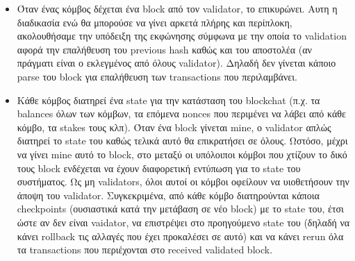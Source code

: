 \documentclass[12pt, a4paper]{article}
\begin{document}
	\begin{itemize}
		\item Όταν ένας κόμβος δέχεται ένα block από τον validator, το επικυρώνει. Αυτη η διαδικασία ενώ θα μπορούσε να γίνει αρκετά πλήρης και περίπλοκη, ακολουθήσαμε την υπόδειξη της εκφώνησης σύμφωνα με την οποία το validation αφορά την επαλήθευση του previous hash καθώς και του αποστολέα (αν πράγματι είναι ο εκλεγμένος από όλους validator). Δηλαδή δεν γίνεται κάποιο parse του block για επαλήθευση των transactions που περιλαμβάνει.
		\item Κάθε κόμβος διατηρεί ένα state για την κατάσταση του blockchat (π.χ. τα balances όλων των κόμβων, τα επόμενα nonces που περιμένει να λάβει από κάθε κόμβο, τα stakes τους κλπ). Όταν ένα block γίνεται mine, ο validator απλώς διατηρεί το state του καθώς τελικά αυτό θα επικρατήσει σε όλους. Ωστόσο, μέχρι να γίνει mine αυτό το block, στο μεταξύ οι υπόλοιποι κόμβοι που χτίζουν το δικό τους block ενδέχεται να έχουν διαφορετική εντύπωση για το state του συστήματος. Ως μη validators, όλοι αυτοί οι κόμβοι οφείλουν να υιοθετήσουν την άποψη του validator. Συγκεκριμένα, από κάθε κόμβο διατηρούνται κάποια checkpoints (ουσιαστικά κατά την μετάβαση σε νέο block) με το state του, έτσι ώστε αν δεν είναι vaidator, να επιστρέψει στο προηγούμενο state του (δηλαδή να κάνει rollback τις αλλαγές που έχει προκαλέσει σε αυτό) και να κάνει rerun όλα τα transactions που περιέχονται στο received validated block.
	\end{itemize}
\end{document}
